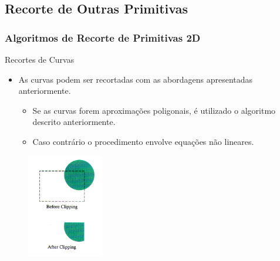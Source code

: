 \documentclass{beamer}
\begin{document}
\subsection{Recorte de Outras Primitivas}
\begin{frame}
\frametitle{Algoritmos de Recorte de Primitivas 2D}

	\begin{block}{Recortes de Curvas}
		\begin{itemize}
			\item  As curvas podem ser recortadas com as abordagens apresentadas anteriormente.
			\begin{itemize}
				\item Se as curvas forem aproximações poligonais, é utilizado o algoritmo descrito anteriormente.
				\item Caso contrário o procedimento envolve equações não lineares.
			\end{itemize}
		\end{itemize}
	\end{block}
	
	\begin{figure}[!h]
			\begin{center}
				\includegraphics[width=0.3\textwidth]{Figures/RecCur}
			\end{center}
	\end{figure}
	

\end{frame}

\end{document}
